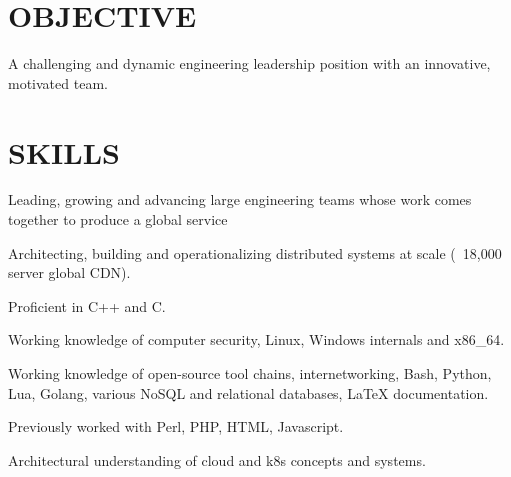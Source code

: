 \documentclass[margin]{res}
\begin{document}

\address{david.andrews112@gmail.com \ \ \ (949) 633-0588}

\begin{resume}

\section{OBJECTIVE}
A challenging and dynamic engineering leadership position with an innovative, motivated team.


\section{SKILLS}
\begin{list}{}{\leftmargin=0em \topsep=0pt \partopsep=0pt \parsep=2.5pt}
  \item Leading, growing and advancing large engineering teams whose work comes together to produce a global service 
  \item Architecting, building and operationalizing distributed systems at scale (~18,000 server global CDN).
  \item Proficient in C++ and C.
  \item Working knowledge of computer security, Linux, Windows internals and x86\_64.
  \item Working knowledge of open-source tool chains, internetworking,
    Bash, Python, Lua, Golang, various NoSQL and relational databases, \LaTeX{} documentation.
  \item Previously worked with Perl, PHP, HTML, Javascript.
  \item Architectural understanding of cloud and k8s concepts and systems.
\end{list}






\end{resume}
\end{document}
